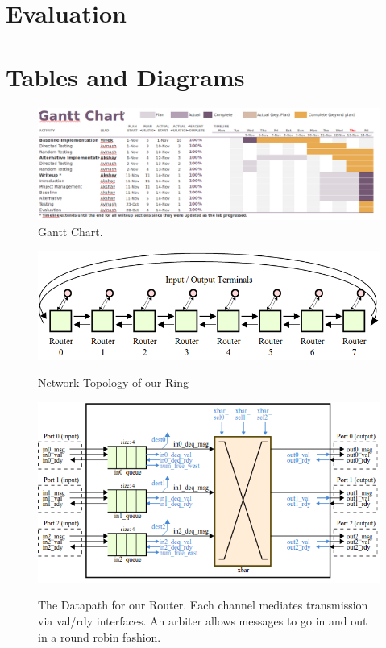 \documentclass[10pt]{article}
\begin{document}
\section{Evaluation}

\newpage
\section {Tables and Diagrams}


\begin{figure}[h]
	\centering
	\includegraphics[scale=0.4, angle=90]{gantt}
	\caption{Gantt Chart.}
	\label{fig:gantt}
\end{figure}

\begin{figure}[h]
	\centering
	\includegraphics[scale=0.5]{topology}
	\label{fig:topo}
	\caption{Network Topology of our Ring}
\end{figure}

\begin{figure}[h]
	\centering
	\includegraphics[scale=0.7]{dpath}
	\label{fig:dpath}
	\caption
	{
		The Datapath for our Router.
		Each channel mediates transmission via val/rdy interfaces.
		An arbiter allows messages to go in and out in a round robin fashion.
	}
\end{figure}
\end{document}
